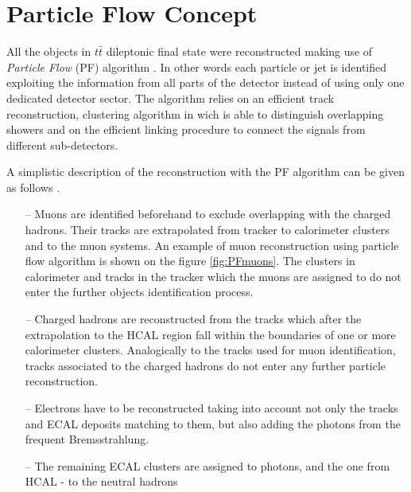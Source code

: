 \section{Particle Flow Concept}\label{sec:PF}

All the objects in $t\bar{t}$ dileptonic final state were reconstructed making use of \textit{Particle Flow} (PF)
algorithm \cite{Beaudette:2014cea}. In other words each particle or jet is identified exploiting the information from all parts
of the detector instead of using only one dedicated detector sector. The algorithm relies on an efficient track reconstruction,
clustering algorithm in wich is able to distinguish overlapping showers and on the efficient linking procedure to connect 
the signals from different sub-detectors.

A simplistic description of the reconstruction with the PF algorithm can be given as follows \cite{Beaudette:2014cea}.

\begin{itemize}
 \item [--] Muons are identified beforehand to exclude overlapping with the charged hadrons. Their tracks are extrapolated
 from tracker to calorimeter clusters and to the muon systems. An example of muon reconstruction using particle flow algorithm is 
 shown on the figure \ref{fig:PFmuons}. The clusters in calorimeter and tracks in the tracker which the muons are assigned to
 do not enter the further objects identification process.
 \item [--] Charged hadrons are reconstructed from the tracks which after the extrapolation to the HCAL region fall within the boundaries
 of one or more calorimeter clusters. Analogically to the tracks used for muon identification, tracks associated to the charged 
 hadrons do not enter any further particle reconstruction.
 \item [--] Electrons have to be reconstructed taking into account not only the tracks and ECAL deposits matching to them, but also
 adding the photons from the frequent Bremsstrahlung.
 \item [--] The remaining ECAL clusters are assigned to photons, and the one from HCAL - to the neutral hadrons
\end{itemize}

